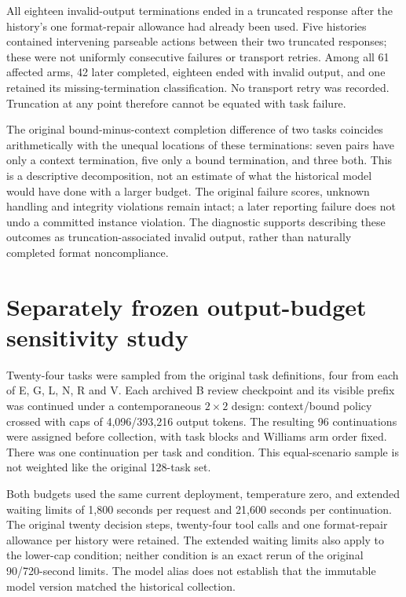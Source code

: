 \documentclass[10pt,a4paper]{article}
\begin{document}
All eighteen invalid-output terminations ended in a truncated response after the history's one format-repair allowance had already been used. Five histories contained intervening parseable actions between their two truncated responses; these were not uniformly consecutive failures or transport retries. Among all 61 affected arms, 42 later completed, eighteen ended with invalid output, and one retained its missing-termination classification. No transport retry was recorded. Truncation at any point therefore cannot be equated with task failure.

The original bound-minus-context completion difference of two tasks coincides arithmetically with the unequal locations of these terminations: seven pairs have only a context termination, five only a bound termination, and three both. This is a descriptive decomposition, not an estimate of what the historical model would have done with a larger budget. The original failure scores, unknown handling and integrity violations remain intact; a later reporting failure does not undo a committed instance violation. The diagnostic supports describing these outcomes as truncation-associated invalid output, rather than naturally completed format noncompliance.

\section{Separately frozen output-budget sensitivity study}
Twenty-four tasks were sampled from the original task definitions, four from each of E, G, L, N, R and V. Each archived B review checkpoint and its visible prefix was continued under a contemporaneous $2\times2$ design: context/bound policy crossed with caps of 4,096/393,216 output tokens. The resulting 96 continuations were assigned before collection, with task blocks and Williams arm order fixed. There was one continuation per task and condition. This equal-scenario sample is not weighted like the original 128-task set.

Both budgets used the same current deployment, temperature zero, and extended waiting limits of 1,800 seconds per request and 21,600 seconds per continuation. The original twenty decision steps, twenty-four tool calls and one format-repair allowance per history were retained. The extended waiting limits also apply to the lower-cap condition; neither condition is an exact rerun of the original 90/720-second limits. The model alias does not establish that the immutable model version matched the historical collection.
\end{document}

